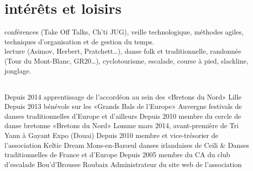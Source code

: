 \documentclass[]{cv} %
\begin{document}
\par\vspace{5\parskip}
\section{intérêts et loisirs}

\textbf{} conférences (Take Off Talks, Ch'ti JUG), veille technologique, méthodes agiles, techniques d'organisation et de gestion du temps.
\vspace{10pt}\\
\textbf{} lecture (Asimov, Herbert, Pratchett…), danse folk et traditionnelle, randonnée (Tour du Mont-Blanc, GR20…), cyclotourisme, escalade, course à pied, slackline, jonglage.
\vspace{10pt}\\
\textbf{}
\vspace{5pt}\\
\begin{entrylist}
\entry
{Depuis 2014}
{{\normalfont apprentissage de l'accordéon au sein des «Bretons du Nord»}}
{Lille}
{}
\entry
{Depuis 2013}
{{\normalfont bénévole sur les «Grands Bals de l'Europe»}}
{Auvergne}
{festivals de danses traditionnelles d'Europe et d'ailleurs}
\entry
{Depuis 2010}
{{\normalfont membre du cercle de danse bretonne «Bretons du Nord»}}
{Lomme}
{mars 2014, avant-première de Tri Yann à Gayant Expo (Douai)}
\entry
{Depuis 2010}
{{\normalfont membre et vice-trésorier de l'association Keltic Dream}}
{Mons-en-Barœul}
{danses irlandaises de Ceili \& Danses traditionnelles de France et d'Europe}
\entry
{Depuis 2005}
{{\normalfont membre du CA du club d'escalade Bou'd'Brousse}}
{Roubaix}
{Administrateur du site web de l'association}
\end{entrylist}
\end{document}
